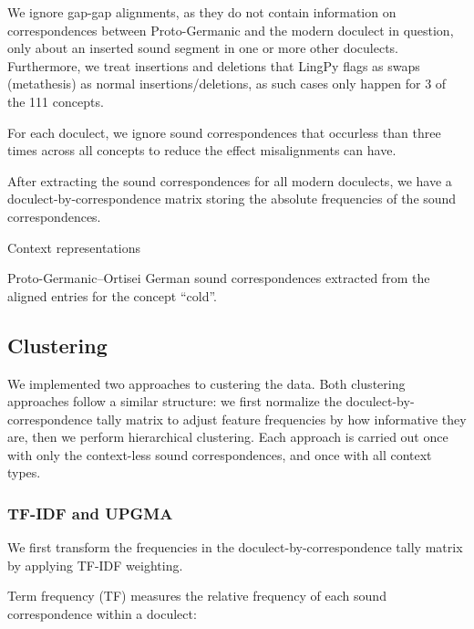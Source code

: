 \documentclass[a4paper]{article}
\begin{document}
We ignore gap-gap alignments,
as they do not contain information on correspondences
between Proto-Germanic and the modern doculect in question,
only about an inserted sound segment in one or more other doculects.
Furthermore, we treat insertions and deletions
that LingPy flags as swaps (metathesis) as normal insertions/deletions,
as such cases only happen for 3 of the 111 concepts.

For each doculect, we ignore sound correspondences
that occurless than three times across all concepts
to reduce the effect misalignments can have. 

After extracting the sound correspondences for
all modern doculects, we have a doculect-by-correspondence
matrix storing the absolute frequencies of the sound correspondences.

\begin{table}[]

\caption{Context representations}
\label{tab:context}
\end{table}

\begin{table}[h]

\caption{
Proto-Germanic--Ortisei German sound correspondences
extracted from the aligned entries for the concept ``cold''.}
\label{tab:corres}
\end{table}


\subsection{Clustering}
\label{subsec:clustering}

We implemented two approaches to custering the data.
Both clustering approaches follow a similar structure:
we first normalize the doculect-by-correspondence tally matrix
to adjust feature frequencies by how informative they are,
then we perform hierarchical clustering.
Each approach is carried out once with only
the context-less sound correspondences,
and once with all context types.

\subsubsection{TF-IDF and UPGMA}
\label{subsubsec:tfidf}

We first transform the frequencies
in the doculect-by-correspondence tally matrix
by applying TF-IDF weighting.


Term frequency (TF) measures the relative frequency
of each sound correspondence within a doculect:
\end{document}
